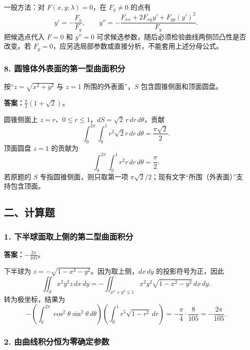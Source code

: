 \documentclass[11pt,fontset=fandol]{ctexart}
\begin{document}
一般方法：对 \(F(x,y;\lambda)=0\)，在 \(F_y\ne0\) 的点有 \[
y'=-\frac{F_x}{F_y},\qquad
y''=-\frac{F_{xx}+2F_{xy}y'+F_{yy}(y')^2}{F_y}.
\] 把候选点代入 \(F=0\) 和 \(y''=0\)
可求候选参数，随后必须检验曲线两侧凹凸性是否改变。若
\(F_y=0\)，应另选局部参数或直接分析，不能套用上述分母公式。

\subsubsection{8.
圆锥体外表面的第一型曲面积分}\label{ux5706ux9525ux4f53ux5916ux8868ux9762ux7684ux7b2cux4e00ux578bux66f2ux9762ux79efux5206}

按``\(z=\sqrt{x^2+y^2}\) 与 \(z=1\) 所围的外表面''，\(S\)
包含圆锥侧面和顶面圆盘。

\textbf{答案：}\(\displaystyle\frac\pi2(1+\sqrt2)\)。

圆锥侧面上 \(z=r\)、\(0\le r\le1\)，\(dS=\sqrt2\,r\,dr\,d\theta\)，贡献
\[
\int_0^{2\pi}\int_0^1r^2\sqrt2r\,dr\,d\theta=\frac{\pi\sqrt2}{2}.
\] 顶面圆盘 \(z=1\) 的贡献为 \[
\int_0^{2\pi}\int_0^1r^2r\,dr\,d\theta=\frac\pi2.
\] 若原题的 \(S\) 专指圆锥侧面，则只取第一项
\(\pi\sqrt2/2\)；现有文字``所围（外表面）''支持包含顶面。

\subsection{二、计算题}\label{ux4e8cux8ba1ux7b97ux9898}

\subsubsection{1.
下半球面取上侧的第二型曲面积分}\label{ux4e0bux534aux7403ux9762ux53d6ux4e0aux4fa7ux7684ux7b2cux4e8cux578bux66f2ux9762ux79efux5206}

\textbf{答案：}\(\displaystyle-\frac{2\pi}{105}\)。

下半球为 \(z=-\sqrt{1-x^2-y^2}\)。因为取上侧，\(dx\,dy\)
的投影符号为正，因此 \[
\iint_Sx^2y^2z\,dx\,dy
=-\iint_{x^2+y^2\le1}x^2y^2\sqrt{1-x^2-y^2}\,dx\,dy.
\] 转为极坐标，结果为 \[
-\left(\int_0^{2\pi}\cos^2\theta\sin^2\theta\,d\theta\right)
\left(\int_0^1r^5\sqrt{1-r^2}\,dr\right)
=-\frac\pi4\cdot\frac8{105}=-\frac{2\pi}{105}.
\]

\subsubsection{2.
由曲线积分恒为零确定参数}\label{ux7531ux66f2ux7ebfux79efux5206ux6052ux4e3aux96f6ux786eux5b9aux53c2ux6570}
\end{document}
